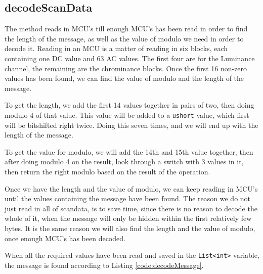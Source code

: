 \subsection{decodeScanData}
The method reads in MCU's till enough MCU's has been read in order to find the length of the message, as well as the value of modulo we need in order to decode it.
Reading in an MCU is a matter of reading in six blocks, each containing one DC value and 63 AC values. The first four are for the Luminance channel, the remaining are the chrominance blocks.
Once the first 16 non-zero values has been found, we can find the value of modulo and the length of the message.

To get the length, we add the first 14 values together in pairs of two, then doing modulo 4 of that value. 
This value will be added to a \lstinline|ushort| value, which first will be bitshifted right twice. 
Doing this seven times, and we will end up with the length of the message.

To get the value for modulo, we will add the 14th and 15th value together, then after doing modulo 4 on the result, look through a switch with 3 values in it, then return the right modulo based on the result of the operation.

Once we have the length and the value of modulo, we can keep reading in MCU's until the values containing the message have been found. 
The reason we do not just read in all of scandata, is to save time, since there is no reason to decode the whole of it, when the message will only be hidden within the first relatively few bytes.
It is the same reason we will also find the length and the value of modulo, once enough MCU's has been decoded.

When all the required values have been read and saved in the \lstinline|List<int>| variable, the message is found according to Listing \ref{code:decodeMessage}.


